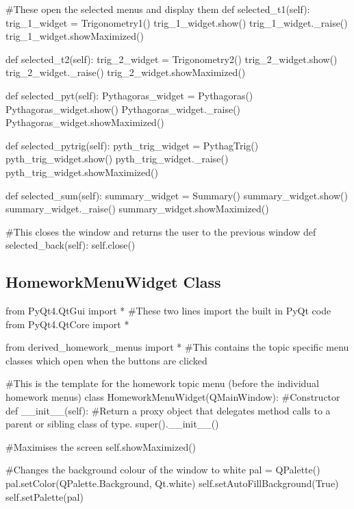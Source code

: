 \begin{landscape}
\begin{python}
    #These open the selected menus and display them
    def selected_t1(self):
        trig_1_widget = Trigonometry1()
        trig_1_widget.show()
        trig_1_widget._raise()
        trig_1_widget.showMaximized()

    def selected_t2(self):
        trig_2_widget = Trigonometry2()
        trig_2_widget.show()
        trig_2_widget._raise()
        trig_2_widget.showMaximized()

    def selected_pyt(self):
        Pythagoras_widget = Pythagoras()
        Pythagoras_widget.show()
        Pythagoras_widget._raise()
        Pythagoras_widget.showMaximized()

    def selected_pytrig(self):
        pyth_trig_widget = PythagTrig()
        pyth_trig_widget.show()
        pyth_trig_widget._raise()
        pyth_trig_widget.showMaximized()

    def selected_sum(self):
        summary_widget = Summary()
        summary_widget.show()
        summary_widget._raise()
        summary_widget.showMaximized()

    #This closes the window and returns the user to the previous window
    def selected_back(self):
        self.close()
\end{python}

\subsection{HomeworkMenuWidget Class}

\begin{python}
from PyQt4.QtGui import * #These two lines import the built in PyQt code
from PyQt4.QtCore import *

from derived_homework_menus import * #This contains the topic specific menu classes which open when the buttons are clicked

#This is the template for the homework topic menu (before the individual homework menus)
class HomeworkMenuWidget(QMainWindow):
    #Constructor
    def __init__(self):
        #Return a proxy object that delegates method calls to a parent or sibling class of type.
        super().__init__()

        #Maximises the screen
        self.showMaximized()

        #Changes the background colour of the window to white
        pal = QPalette()
        pal.setColor(QPalette.Background, Qt.white)
        self.setAutoFillBackground(True)
        self.setPalette(pal)


\end{python}
\end{landscape}
